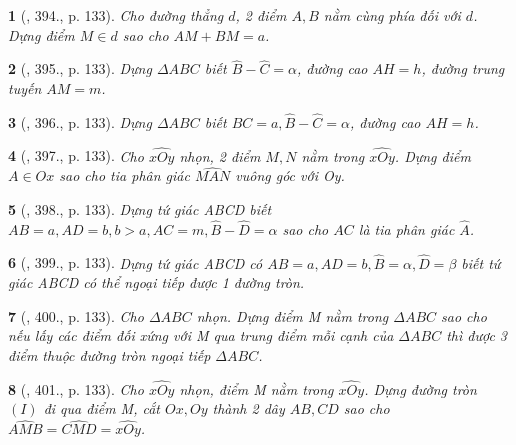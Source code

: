 \documentclass{article}
\newtheorem{baitoan}{}
\begin{document}
\begin{baitoan}[\cite{Binh_Toan_9_tap_2}, 394., p. 133]
	Cho đường thẳng $d$, 2 điểm $A,B$ nằm cùng phía đối với $d$. Dựng điểm $M\in d$ sao cho $AM + BM = a$.
\end{baitoan}

\begin{baitoan}[\cite{Binh_Toan_9_tap_2}, 395., p. 133]
	Dựng $\Delta ABC$ biết $\widehat{B} - \widehat{C} = \alpha$, đường cao $AH = h$, đường trung tuyến $AM = m$.
\end{baitoan}

\begin{baitoan}[\cite{Binh_Toan_9_tap_2}, 396., p. 133]
	Dựng $\Delta ABC$ biết $BC = a,\widehat{B} - \widehat{C} = \alpha$, đường cao $AH = h$.
\end{baitoan}

\begin{baitoan}[\cite{Binh_Toan_9_tap_2}, 397., p. 133]
	Cho $\widehat{xOy}$ nhọn, 2 điểm $M,N$ nằm trong $\widehat{xOy}$. Dựng điểm $A\in Ox$ sao cho tia phân giác $\widehat{MAN}$ vuông góc với Oy.
\end{baitoan}

\begin{baitoan}[\cite{Binh_Toan_9_tap_2}, 398., p. 133]
	Dựng tứ giác ABCD biết $AB = a,AD = b,b > a,AC = m,\widehat{B} - \widehat{D} = \alpha$ sao cho $AC$ là tia phân giác $\widehat{A}$.
\end{baitoan}

\begin{baitoan}[\cite{Binh_Toan_9_tap_2}, 399., p. 133]
	Dựng tứ giác ABCD có $AB = a,AD = b,\widehat{B} = \alpha,\widehat{D} = \beta$ biết tứ giác ABCD có thể ngoại tiếp được 1 đường tròn.
\end{baitoan}

\begin{baitoan}[\cite{Binh_Toan_9_tap_2}, 400., p. 133]
	Cho $\Delta ABC$ nhọn. Dựng điểm M nằm trong $\Delta ABC$ sao cho nếu lấy các điểm đối xứng với M qua trung điểm mỗi cạnh của $\Delta ABC$ thì được 3 điểm thuộc đường tròn ngoại tiếp $\Delta ABC$.
\end{baitoan}

\begin{baitoan}[\cite{Binh_Toan_9_tap_2}, 401., p. 133]
	Cho $\widehat{xOy}$ nhọn, điểm M nằm trong $\widehat{xOy}$. Dựng đường tròn $(I)$ đi qua điểm M, cắt $Ox,Oy$ thành 2 dây $AB,CD$ sao cho $\widehat{AMB} = \widehat{CMD} = \widehat{xOy}$.
\end{baitoan}
\end{document}
